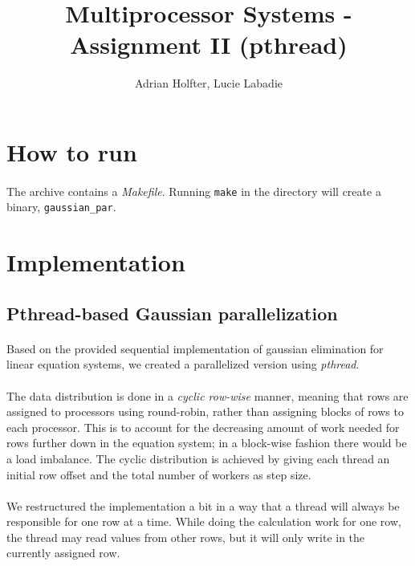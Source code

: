 \documentclass[]{article}
\title{Multiprocessor Systems - Assignment II (pthread)}
\author{Adrian Holfter, Lucie Labadie}
\begin{document}
\maketitle

\section{How to run}

\paragraph{} The archive contains a \emph{Makefile}. Running \texttt{make} in the directory will create a binary, \texttt{gaussian\_par}.

\section{Implementation}

\subsection{Pthread-based Gaussian parallelization}

\paragraph{} Based on the provided sequential implementation of gaussian elimination for linear equation systems, we created a parallelized version using \emph{pthread}.

\paragraph{} The data distribution is done in a \emph{cyclic row-wise} manner, meaning that rows are assigned to processors using round-robin, rather than assigning blocks of rows to each processor. This is to account for the decreasing amount of work needed for rows further down in the equation system; in a block-wise fashion there would be a load imbalance. The cyclic distribution is achieved by giving each thread an initial row offset and the total number of workers as step size.

\paragraph{} We restructured the implementation a bit in a way that a thread will always be responsible for one row at a time. While doing the calculation work for one row, the thread may read values from other rows, but it will only write in the currently assigned row.
\end{document}

